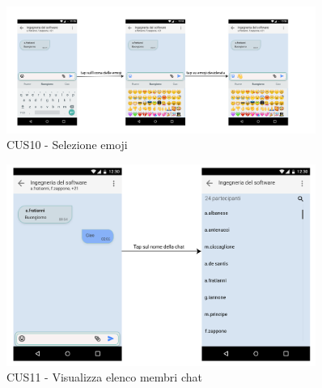 \begin{figure}
	\centering
	\includegraphics[width=0.9\textwidth]{imgs/gruppo6/activities/act_cus10_seleziona_emoji.pdf}
	\caption{CUS10 - Selezione emoji}
	\label{fig:act-cus10}
\end{figure}

\begin{figure}
	\centering
	\includegraphics[width=0.9\textwidth]{imgs/gruppo6/activities/act_cus11_elenco_membri.pdf}
	\caption{CUS11 - Visualizza elenco membri chat}
	\label{fig:act-cus11}
\end{figure}

